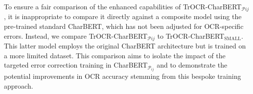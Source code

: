 To ensure a fair comparison of the enhanced capabilities of TrOCR-CharBERT$_{\mathcal{P}{ij}}$, it is inappropriate to compare it directly against a composite model using the pre-trained standard CharBERT, which has not been adjusted for OCR-specific errors. Instead, we compare TrOCR-CharBERT$_{\mathcal{P}{ij}}$ to TrOCR-CharBERT$_{\text{SMALL}}$. This latter model employs the original CharBERT architecture but is trained on a more limited dataset. This comparison aims to isolate the impact of the targeted error correction training in CharBERT$_{\mathcal{P}_{ij}}$ and to demonstrate the potential improvements in OCR accuracy stemming from this bespoke training approach.